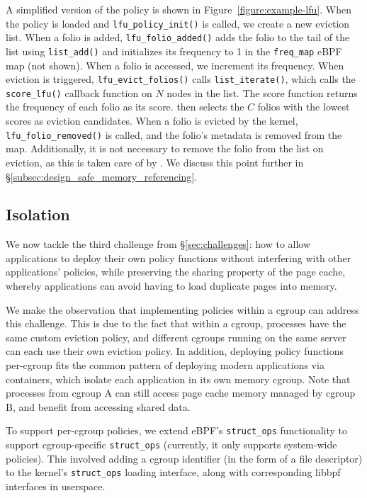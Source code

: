 A simplified version of the policy is shown in Figure~\ref{figure:example-lfu}. When the policy is loaded and \texttt{lfu\_policy\_init()} is called, we create a new eviction list. When a folio is added, \texttt{lfu\_folio\_added()} adds the folio to the tail of the list using \texttt{list\_add()} and initializes its frequency to 1 in the \texttt{freq\_map} eBPF map (not shown). When a folio is accessed, we increment its frequency. When eviction is triggered, \texttt{lfu\_evict\_folios()} calls \texttt{list\_iterate()}, which calls the \texttt{score\_lfu()} callback function on $N$ nodes in the list. The score function returns the frequency of each folio as its score. \name then selects the $C$ folios with the lowest scores as eviction candidates. When a folio is evicted by the kernel, \texttt{lfu\_folio\_removed()} is called, and the folio's metadata is removed from the map. Additionally, it is not necessary to remove the folio from the list on eviction, as this is taken care of by \name. We discuss this point further in \S\ref{subsec:design_safe_memory_referencing}.






\subsection{Isolation}
\label{subsec:design_isolation}

We now tackle the third challenge from \S\ref{sec:challenges}: how to allow applications to deploy their own policy functions without interfering with other applications' policies, while preserving the sharing property of the page cache, whereby applications can avoid having to load duplicate pages into memory. 

We make the observation that implementing policies within a cgroup can address this challenge. %
This is due to the fact that within a cgroup, processes have the same custom eviction policy, and different cgroups running on the same server can each use their own eviction policy. In addition, deploying policy functions per-cgroup fits the common pattern of deploying modern applications via containers, which isolate each application in its own memory cgroup. Note that processes from cgroup A can still access page cache memory managed by cgroup B, and benefit from accessing shared data. %

To support per-cgroup policies, we extend eBPF's \texttt{struct\_ops} functionality to support cgroup-specific \texttt{struct\_ops} (currently, it only supports system-wide policies). This involved adding a cgroup identifier (in the form of a file descriptor) to the kernel's \texttt{struct\_ops} loading interface, along with corresponding libbpf interfaces in userspace. %



